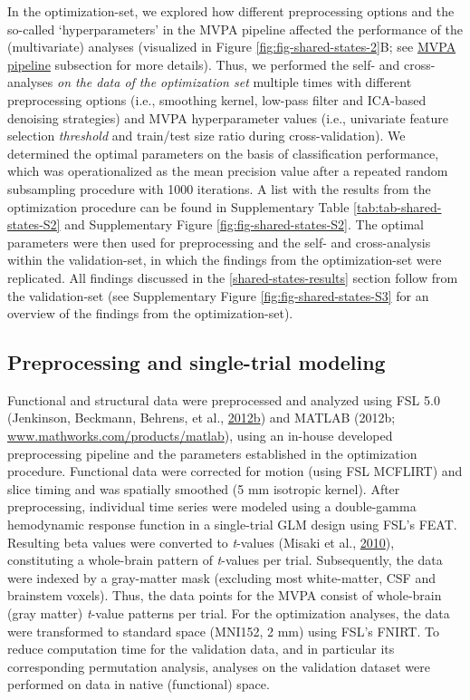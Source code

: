\documentclass[11pt,american,a4paper,oneside,]{memoir} %
\begin{document}
In the optimization-set, we explored how different preprocessing options and the so-called `hyperparameters' in the MVPA pipeline affected the performance of the (multivariate) analyses (visualized in Figure \ref{fig:fig-shared-states-2}B; see \protect\hyperlink{shared-states-methods-mvpa-pipeline}{MVPA pipeline} subsection for more details). Thus, we performed the self- and cross-analyses \emph{on the data of the optimization set} multiple times with different preprocessing options (i.e., smoothing kernel, low-pass filter and ICA-based denoising strategies) and MVPA hyperparameter values (i.e., univariate feature selection \emph{threshold} and train/test size ratio during cross-validation). We determined the optimal parameters on the basis of classification performance, which was operationalized as the mean precision value after a repeated random subsampling procedure with 1000 iterations. A list with the results from the optimization procedure can be found in Supplementary Table \ref{tab:tab-shared-states-S2} and Supplementary Figure \ref{fig:fig-shared-states-S2}. The optimal parameters were then used for preprocessing and the self- and cross-analysis within the validation-set, in which the findings from the optimization-set were replicated. All findings discussed in the \ref{shared-states-results} section follow from the validation-set (see Supplementary Figure \ref{fig:fig-shared-states-S3} for an overview of the findings from the optimization-set).

\hypertarget{shared-states-methods-preprocessing}{%
\subsection{Preprocessing and single-trial modeling}\label{shared-states-methods-preprocessing}}

Functional and structural data were preprocessed and analyzed using FSL 5.0 (Jenkinson, Beckmann, Behrens, et al., \protect\hyperlink{ref-jenkinson2012fsl}{2012}\protect\hyperlink{ref-jenkinson2012fsl}{b}) and MATLAB (2012b; \url{www.mathworks.com/products/matlab}), using an in-house developed preprocessing pipeline and the parameters established in the optimization procedure. Functional data were corrected for motion (using FSL MCFLIRT) and slice timing and was spatially smoothed (5 mm isotropic kernel). After preprocessing, individual time series were modeled using a double-gamma hemodynamic response function in a single-trial GLM design using FSL's FEAT. Resulting beta values were converted to \emph{t}-values (Misaki et al., \protect\hyperlink{ref-misaki2010comparison}{2010}), constituting a whole-brain pattern of \emph{t}-values per trial. Subsequently, the data were indexed by a gray-matter mask (excluding most white-matter, CSF and brainstem voxels). Thus, the data points for the MVPA consist of whole-brain (gray matter) \emph{t}-value patterns per trial. For the optimization analyses, the data were transformed to standard space (MNI152, 2 mm) using FSL's FNIRT. To reduce computation time for the validation data, and in particular its corresponding permutation analysis, analyses on the validation dataset were performed on data in native (functional) space.
\end{document}
